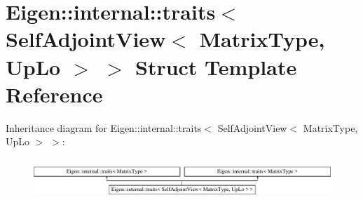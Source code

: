 \hypertarget{struct_eigen_1_1internal_1_1traits_3_01_self_adjoint_view_3_01_matrix_type_00_01_up_lo_01_4_01_4}{}\section{Eigen\+:\+:internal\+:\+:traits$<$ Self\+Adjoint\+View$<$ Matrix\+Type, Up\+Lo $>$ $>$ Struct Template Reference}
\label{struct_eigen_1_1internal_1_1traits_3_01_self_adjoint_view_3_01_matrix_type_00_01_up_lo_01_4_01_4}
Inheritance diagram for Eigen\+:\+:internal\+:\+:traits$<$ Self\+Adjoint\+View$<$ Matrix\+Type, Up\+Lo $>$ $>$\+:\begin{figure}[H]
\begin{center}
\leavevmode
\includegraphics[height=1.509434cm]{struct_eigen_1_1internal_1_1traits_3_01_self_adjoint_view_3_01_matrix_type_00_01_up_lo_01_4_01_4}
\end{center}
\end{figure}
